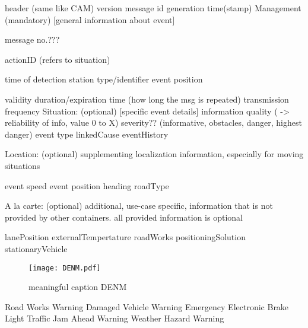 
header (same like CAM)
    version
    message id
    generation time(stamp)
Management (mandatory)
    [general information about event]
    
    message no.???

    actionID (refers to situation)
    
    time of detection
    station type/identifier
    event position
    
    validity duration/expiration time    (how long the msg is repeated)
    transmission frequency
Situation: (optional)
    [specific event details]
    information quality ( -> reliability of info, value 0 to X)
        severity?? (informative, obstacles, danger, highest danger)
    event type
    linkedCause
    eventHistory
    

Location: (optional)
    supplementing localization information, especially for moving situations
    
    event speed
    event position heading
    roadType    

A la carte: (optional)
    additional, use-case specific, information that is not provided by other containers.
    all provided information is optional
    
    lanePosition
    externalTempertature
    roadWorks
    positioningSolution
    stationaryVehicle

\begin{figure}[H]
    \centering
    \texttt{[image: DENM.pdf]}
    \caption{meaningful caption DENM}
    \label{fig:denm-structure}
\end{figure}


Road Works Warning
Damaged Vehicle Warning
Emergency Electronic Brake Light
Traffic Jam Ahead Warning
Weather Hazard Warning

